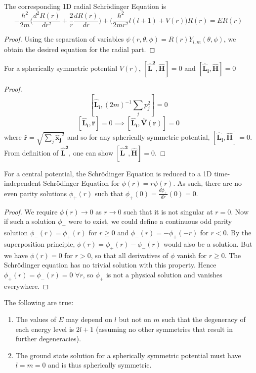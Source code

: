 \documentclass[a4paper]{article}
\begin{document}
\begin{cor}
The corresponding 1D radial Schr\"{o}dinger Equation is
$$-\frac{\hbar^2}{2m}\bigg(\frac{d^2R(r)}{dr^2}+\frac{2}{r}\frac{dR(r)}{dr}\bigg)+\bigg(\frac{\hbar^2}{2mr^2}l(l+1)+V(r)\bigg)R(r)=ER(r)$$
\end{cor}
\begin{proof}
Using the separation of variables $\psi(r,\theta,\phi)=R(r)Y_{l,m}(\theta,\phi)$, we obtain the desired equation for the radial part.
\end{proof}
\begin{cor}
For a spherically symmetric potential $V(r)$, $[\mathbf{\hat{L}^2},\mathbf{\hat{H}}]=0$ and $[\mathbf{\hat{L}_i},\mathbf{\hat{H}}]=0$
\end{cor}
\begin{proof}
$$[\mathbf{\hat{L}_i},(2m)^{-1}\sum_jp_j^2]=0$$
$$[\mathbf{\hat{L}_i},\mathbf{\hat{r}}]=0\implies[\mathbf{\hat{L}_i},\mathbf{\hat{V}(r)}]=0$$
where $\mathbf{\hat{r}}=\sqrt{\sum_j\mathbf{\hat{x}_j}^2}$ and so for any spherically symmetric potential, $[\mathbf{\hat{L}_i},\mathbf{\hat{H}}]=0$. From definition of $\mathbf{\hat{L}^2}$, one can show $[\mathbf{\hat{L}^2},\mathbf{\hat{H}}]=0$.
\end{proof}
\begin{cor}
For a central potential, the Schr\"{o}dinger Equation is reduced to a 1D time-independent Schr\"{o}dinger Equation for $\phi(r)=r\psi(r)$. As such, there are no even parity solutions $\phi_+(r)$ such that $\phi_+(0)=\frac{d\phi_+}{dr}(0)=0$.
\end{cor}
\begin{proof}
We require $\phi(r)\rightarrow0$ as $r\rightarrow0$ such that it is not singular at $r=0$. Now if such a solution $\phi_+$ were to exist, we could define a continuous odd parity solution $\phi_-(r)=\phi_+(r)$ for $r\geq0$ and $\phi_-(r)=-\phi_+(-r)$ for $r<0$. By the superposition principle, $\phi(r)=\phi_+(r)-\phi_-(r)$ would also be a solution. But we have $\phi(r)=0$ for $r>0$, so that all derivatives of $\phi$ vanish for $r\geq0$. The Schr\"{o}dinger equation has no trivial solution with this property. Hence $\phi_+(r)=\phi_-(r)=0$ $\forall r$, so $\phi_+$ is not a physical solution and vanishes everywhere.
\end{proof}
\begin{thm}
The following are true:
\begin{enumerate}
    \item The values of $E$ may depend on $l$ but not on $m$ such that the degeneracy of each energy level is $2l+1$ (assuming no other symmetries that result in further degeneracies).
    \item The ground state solution for a spherically symmetric potential must have $l=m=0$ and is thus spherically symmetric.
\end{enumerate}
\end{thm}
\end{document}
